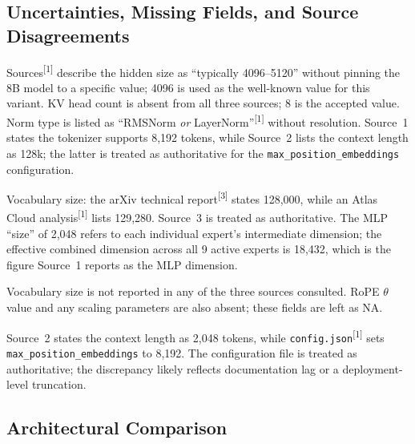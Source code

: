 \documentclass[11pt, a4paper]{article}
\newcommand{\src}[1]{\textsuperscript{\normalfont\small[#1]}}
\begin{document}
\subsection{Uncertainties, Missing Fields, and Source Disagreements}
\label{sec:uncertainty}

\begin{description}[leftmargin=2.2cm,labelwidth=2cm,style=sameline]

\item[\textbf{Llama}]
  Sources\src{1} describe the hidden size as ``typically 4096--5120'' without
  pinning the 8B model to a specific value; 4096 is used as the well-known
  value for this variant.
  KV head count is absent from all three sources; 8 is the accepted value.
  Norm type is listed as ``RMSNorm \emph{or} LayerNorm''\src{1} without
  resolution.
  Source~1 states the tokenizer supports 8,192 tokens, while Source~2 lists the
  context length as 128k; the latter is treated as authoritative for the
  \texttt{max\_position\_embeddings} configuration.

\item[\textbf{DeepSeek-V3}]
  Vocabulary size: the arXiv technical report\src{3} states 128,000, while an
  Atlas Cloud analysis\src{1} lists 129,280.
  Source~3 is treated as authoritative.
  The MLP ``size'' of 2,048 refers to each individual expert's intermediate
  dimension; the effective combined dimension across all 9 active experts is
  18,432, which is the figure Source~1 reports as the MLP dimension.

\item[\textbf{Granite}]
  Vocabulary size is not reported in any of the three sources consulted.
  RoPE $\theta$ value and any scaling parameters are also absent; these fields
  are left as NA.

\item[\textbf{SmolLM2}]
  Source~2 states the context length as 2,048 tokens, while
  \texttt{config.json}\src{1} sets \texttt{max\_position\_embeddings} to 8,192.
  The configuration file is treated as authoritative; the discrepancy likely
  reflects documentation lag or a deployment-level truncation.

\end{description}

\subsection{Architectural Comparison}
\end{document}
